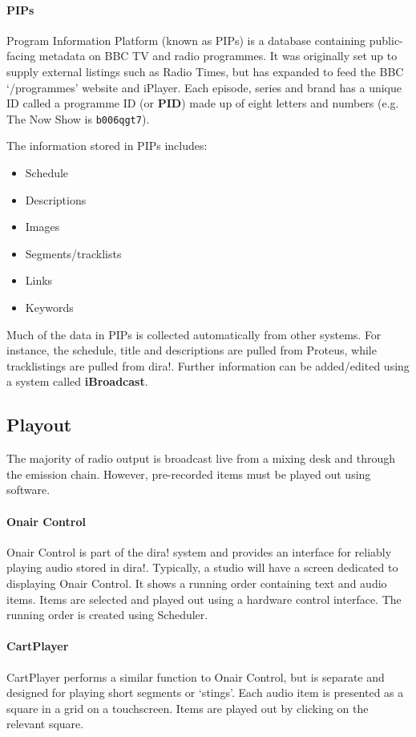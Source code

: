 \paragraph{PIPs}\label{sec:pips}
Program Information Platform (known as PIPs) is a database containing
public-facing metadata on BBC TV and radio programmes. It was originally set up
to supply external listings such as Radio Times, but has expanded to feed
the BBC `/programmes' website and iPlayer. Each episode, series and brand has a
unique ID called a programme ID (or \textbf{PID}) made up of eight letters and
numbers (e.g. The Now Show is \texttt{b006qgt7}).

The information stored in PIPs includes:
\begin{itemize}
  \item Schedule
  \item Descriptions
  \item Images
  \item Segments/tracklists
  \item Links
  \item Keywords
\end{itemize}

Much of the data in PIPs is collected automatically from other systems. For
instance, the schedule, title and descriptions are pulled from Proteus, while
tracklistings are pulled from dira!. Further information can be added/edited
using a system called \textbf{iBroadcast}.


\subsection{Playout}
The majority of radio output is broadcast live from a mixing desk and through
the emission chain. However, pre-recorded items must be played out using
software.

\paragraph{Onair Control}
Onair Control is part of the dira! system and provides an interface for
reliably playing audio stored in dira!. Typically, a studio will have a screen
dedicated to displaying Onair Control. It shows a running order containing
text and audio items. Items are selected and played out using a hardware
control interface. The running order is created using Scheduler. 

\paragraph{CartPlayer}
CartPlayer performs a similar function to Onair Control, but is separate and
designed for playing short segments or `stings'. Each audio item is presented
as a square in a grid on a touchscreen. Items are played out by clicking on the
relevant square.

